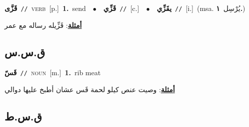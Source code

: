 \documentclass[10pt,a4paper,twoside]{article} %
\begin{document}
\begin{multicols}{2}
{\setlength\topsep{0pt}\textbf{\foreignlanguage{arabic}{قَزَّى}}\ {\color{gray}\texttt{//}\color{black}}\ \textsc{verb}\ [p.]\ \textbf{1.}~send\ \ $\bullet$\ \ \setlength\topsep{0pt}\textbf{\foreignlanguage{arabic}{قَزِّي}}\ {\color{gray}\texttt{//}\color{black}}\ [c.]\ \ $\bullet$\ \ \setlength\topsep{0pt}\textbf{\foreignlanguage{arabic}{يقَزِّي}}\ {\color{gray}\texttt{//}\color{black}}\ [i.]\ \color{gray}(msa. \foreignlanguage{arabic}{يُرْسِل}~\foreignlanguage{arabic}{\textbf{١.}})\color{black}\  \begin{flushright}\color{gray}\foreignlanguage{arabic}{\textbf{\underline{\foreignlanguage{arabic}{أمثلة}}}: قَزِّيله رساله مع عمر}\end{flushright}\color{black}} \vspace{2mm}

\vspace{-3mm}
\subsection*{\color{blue}\foreignlanguage{arabic}{ق.س.س}\color{blue}{}} 

{\setlength\topsep{0pt}\textbf{\foreignlanguage{arabic}{قَسّ}}\ {\color{gray}\texttt{//}\color{black}}\ \textsc{noun}\ [m.]\ \textbf{1.}~rib meat\  \begin{flushright}\color{gray}\foreignlanguage{arabic}{\textbf{\underline{\foreignlanguage{arabic}{أمثلة}}}: وصيت عنص كيلو لحمة قَس عشان أطبخ عليها دوالي}\end{flushright}\color{black}} \vspace{2mm}

\vspace{-3mm}
\subsection*{\color{blue}\foreignlanguage{arabic}{ق.س.ط}\color{blue}{}} 


\end{multicols}
\end{document}
